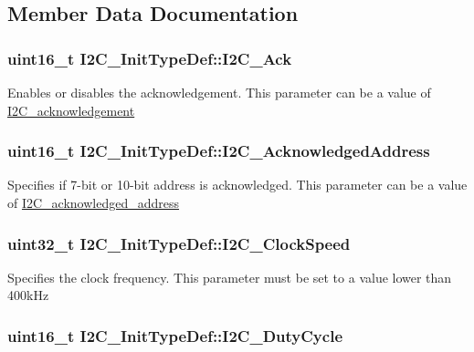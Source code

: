 \subsection{Member Data Documentation}
\hypertarget{structI2C__InitTypeDef_a7bcae26f098e897832e5e42b055f8c98}{
\subsubsection[{I2C\_\-Ack}]{\setlength{\rightskip}{0pt plus 5cm}uint16\_\-t {\bf I2C\_\-InitTypeDef::I2C\_\-Ack}}}
\label{structI2C__InitTypeDef_a7bcae26f098e897832e5e42b055f8c98}
Enables or disables the acknowledgement. This parameter can be a value of \hyperlink{group__I2C__acknowledgement}{I2C\_\-acknowledgement} \hypertarget{structI2C__InitTypeDef_a300e847972f50b0d25c4f13be5d93d79}{
\subsubsection[{I2C\_\-AcknowledgedAddress}]{\setlength{\rightskip}{0pt plus 5cm}uint16\_\-t {\bf I2C\_\-InitTypeDef::I2C\_\-AcknowledgedAddress}}}
\label{structI2C__InitTypeDef_a300e847972f50b0d25c4f13be5d93d79}
Specifies if 7-\/bit or 10-\/bit address is acknowledged. This parameter can be a value of \hyperlink{group__I2C__acknowledged__address}{I2C\_\-acknowledged\_\-address} \hypertarget{structI2C__InitTypeDef_a737c289f4515ae4cb642db0412762169}{
\subsubsection[{I2C\_\-ClockSpeed}]{\setlength{\rightskip}{0pt plus 5cm}uint32\_\-t {\bf I2C\_\-InitTypeDef::I2C\_\-ClockSpeed}}}
\label{structI2C__InitTypeDef_a737c289f4515ae4cb642db0412762169}
Specifies the clock frequency. This parameter must be set to a value lower than 400kHz \hypertarget{structI2C__InitTypeDef_aff23b28652359513dfd268dee54c3279}{
\subsubsection[{I2C\_\-DutyCycle}]{\setlength{\rightskip}{0pt plus 5cm}uint16\_\-t {\bf I2C\_\-InitTypeDef::I2C\_\-DutyCycle}}}
